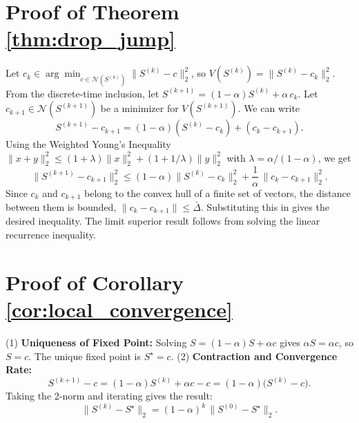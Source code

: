 \documentclass[journal]{IEEEtran}
\begin{document}
\section{Proof of Theorem \ref{thm:drop_jump}}
\label{app:proof_thm_drop_jump}
\begin{IEEEproof}
Let $c_k\in\arg\min_{c\in\mathcal N(S^{(k)})}\|S^{(k)}-c\|_2^2$, so $V(S^{(k)})=\|S^{(k)}-c_k\|_2^2$.
From the discrete-time inclusion, let $S^{(k+1)}=(1-\alpha)S^{(k)}+\alpha\,c_k$.
Let $c_{k+1}\in\mathcal N(S^{(k+1)})$ be a minimizer for $V(S^{(k+1)})$. We can write
\begin{equation}
S^{(k+1)}-c_{k+1}=(1-\alpha)(S^{(k)}-c_k) + (c_k-c_{k+1}).
\end{equation}
Using the Weighted Young's Inequality $\|x+y\|_2^2\le (1+\lambda)\|x\|_2^2+(1+1/\lambda)\|y\|_2^2$ with $\lambda=\alpha/(1-\alpha)$, we get
\begin{equation}
\|S^{(k+1)}-c_{k+1}\|_2^2 \le (1-\alpha)\|S^{(k)}-c_k\|_2^2 + \frac{1}{\alpha}\,\|c_k-c_{k+1}\|_2^2.
\end{equation}
Since $c_k$ and $c_{k+1}$ belong to the convex hull of a finite set of vectors, the distance between them is bounded, $\|c_k-c_{k+1}\|\le \bar\Delta$. Substituting this in gives the desired inequality. The limit superior result follows from solving the linear recurrence inequality.
\end{IEEEproof}

\section{Proof of Corollary \ref{cor:local_convergence}}
\label{app:proof_cor_local_convergence}
\begin{IEEEproof}
(1) \textbf{Uniqueness of Fixed Point:} Solving $S=(1-\alpha)S+\alpha c$ gives $\alpha S=\alpha c$, so $S=c$. The unique fixed point is $S^\star=c$.
(2) \textbf{Contraction and Convergence Rate:}
\begin{equation}
S^{(k+1)}-c = (1-\alpha)S^{(k)}+\alpha c-c = (1-\alpha)\big(S^{(k)}-c\big).
\end{equation}
Taking the 2-norm and iterating gives the result:
\begin{equation}
\|S^{(k)}-S^\star\|_2 = (1-\alpha)^k\,\|S^{(0)}-S^\star\|_2.
\end{equation}
\end{IEEEproof}
\end{document}
